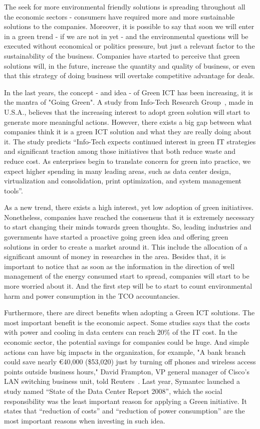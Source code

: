     The seek for more environmental friendly solutions is spreading throughout all the economic sectors - consumers have required more and more sustainable solutions to the companies. Moreover, it is possible to say that soon we will enter in a green trend - if we are not in yet - and the environmental questions will be executed without economical or politics pressure, but just a relevant factor to the sustainability of the business. Companies have started to perceive that green solutions will, in the future, increase the quantity and quality of business, or even that this strategy of doing business will overtake competitive advantage for deals.
        
    In the last years, the concept - and idea - of Green ICT has been increasing, it is the mantra of "Going Green". A study from Info-Tech Research Group~\cite{info-tech07}, made in U.S.A., believes that the increasing interest to adopt green solution will start to generate more meaningful actions. However, there exists a big gap between what companies think it is a green ICT solution and what they are really doing about it. The study predicts ``Info-Tech expects continued interest in green IT strategies and significant traction among those initiatives that both reduce waste and reduce cost. As enterprises begin to translate concern for green into practice, we expect higher spending in many leading areas, such as data center design, virtualization and consolidation, print optimization, and system management tools''.
    
    As a new trend, there exists a high interest, yet low adoption of green initiatives. Nonetheless, companies have reached the consensus that it is extremely necessary to start changing their minds towards green thoughts. So, leading industries and governments have started a proactive going green idea and offering green solutions in order to create a market around it. This include the allocation of a significant amount of money in researches in the area. Besides that, it is important to notice that as soon as the information in the direction of well management of the energy consumed start to spread, companies will start to be more worried about it. And the first step will be to start to count environmental harm and power consumption in the TCO accountancies.
    
    Furthermore, there are direct benefits when adopting a Green ICT solutions. The most important benefit is the economic aspect. Some studies says that the costs with power and cooling in data centers can reach 20\% of the IT cost. In the economic sector, the potential savings for companies could be huge. And simple actions can have big impacts in the organization, for example, "A bank branch could save nearly \euro40,000 (\$53,020) just by turning off phones and wireless access points outside business hours," David Frampton, VP general manager of Cisco's LAN switching business unit, told Reuters~\cite{Chestney2009}. Last year, Symantec launched a study named ``State of the Data Center Report 2008'', which the social responsibility was the least important reason for applying a Green initiative. It states that ``reduction of costs'' and ``reduction of power consumption'' are the most important reasons when investing in such idea. 
    
